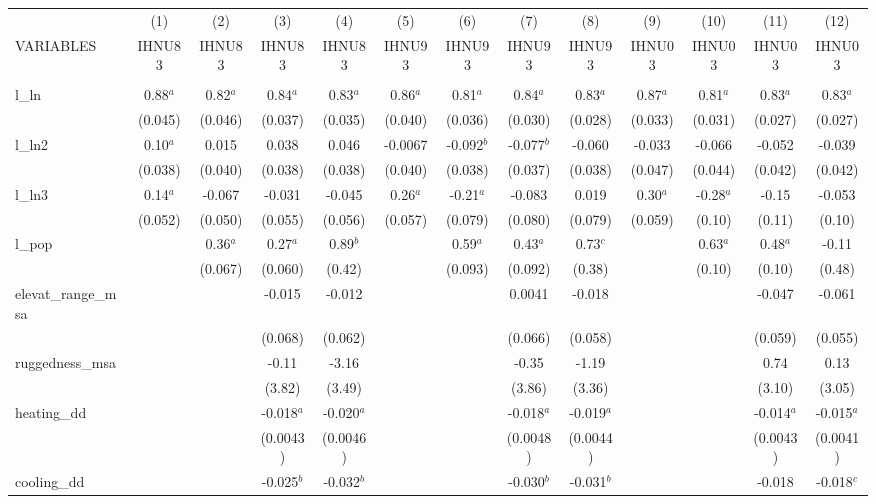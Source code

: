 \documentclass[]{article}
\begin{document}
\begin{tabular}{lcccccccccccc} \hline
 & (1) & (2) & (3) & (4) & (5) & (6) & (7) & (8) & (9) & (10) & (11) & (12) \\
VARIABLES & IHNU83 & IHNU83 & IHNU83 & IHNU83 & IHNU93 & IHNU93 & IHNU93 & IHNU93 & IHNU03 & IHNU03 & IHNU03 & IHNU03 \\ \hline
 &  &  &  &  &  &  &  &  &  &  &  &  \\
l\_ln & 0.88$^a$ & 0.82$^a$ & 0.84$^a$ & 0.83$^a$ & 0.86$^a$ & 0.81$^a$ & 0.84$^a$ & 0.83$^a$ & 0.87$^a$ & 0.81$^a$ & 0.83$^a$ & 0.83$^a$ \\
 & (0.045) & (0.046) & (0.037) & (0.035) & (0.040) & (0.036) & (0.030) & (0.028) & (0.033) & (0.031) & (0.027) & (0.027) \\
l\_ln2 & 0.10$^a$ & 0.015 & 0.038 & 0.046 & -0.0067 & -0.092$^b$ & -0.077$^b$ & -0.060 & -0.033 & -0.066 & -0.052 & -0.039 \\
 & (0.038) & (0.040) & (0.038) & (0.038) & (0.040) & (0.038) & (0.037) & (0.038) & (0.047) & (0.044) & (0.042) & (0.042) \\
l\_ln3 & 0.14$^a$ & -0.067 & -0.031 & -0.045 & 0.26$^a$ & -0.21$^a$ & -0.083 & 0.019 & 0.30$^a$ & -0.28$^a$ & -0.15 & -0.053 \\
 & (0.052) & (0.050) & (0.055) & (0.056) & (0.057) & (0.079) & (0.080) & (0.079) & (0.059) & (0.10) & (0.11) & (0.10) \\
l\_pop &  & 0.36$^a$ & 0.27$^a$ & 0.89$^b$ &  & 0.59$^a$ & 0.43$^a$ & 0.73$^c$ &  & 0.63$^a$ & 0.48$^a$ & -0.11 \\
 &  & (0.067) & (0.060) & (0.42) &  & (0.093) & (0.092) & (0.38) &  & (0.10) & (0.10) & (0.48) \\
elevat\_range\_msa &  &  & -0.015 & -0.012 &  &  & 0.0041 & -0.018 &  &  & -0.047 & -0.061 \\
 &  &  & (0.068) & (0.062) &  &  & (0.066) & (0.058) &  &  & (0.059) & (0.055) \\
ruggedness\_msa &  &  & -0.11 & -3.16 &  &  & -0.35 & -1.19 &  &  & 0.74 & 0.13 \\
 &  &  & (3.82) & (3.49) &  &  & (3.86) & (3.36) &  &  & (3.10) & (3.05) \\
heating\_dd &  &  & -0.018$^a$ & -0.020$^a$ &  &  & -0.018$^a$ & -0.019$^a$ &  &  & -0.014$^a$ & -0.015$^a$ \\
 &  &  & (0.0043) & (0.0046) &  &  & (0.0048) & (0.0044) &  &  & (0.0043) & (0.0041) \\
cooling\_dd &  &  & -0.025$^b$ & -0.032$^b$ &  &  & -0.030$^b$ & -0.031$^b$ &  &  & -0.018 & -0.018$^c$ \\

\end{tabular}
\end{document}

